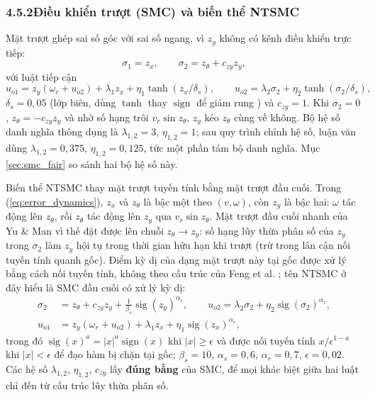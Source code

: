 \documentclass[12pt,a4paper]{article}
\makeatletter
\newcommand{\seclabel}[2]{\phantomsection\protected@edef\@currentlabel{#2}\label{#1}}
\DeclareMathOperator{\sign}{sign}
\makeatother
\begin{document}
\subsubsection*{4.5.2\quad Điều khiển trượt (SMC) và biến thể NTSMC}
\seclabel{sec:smc}{4.5.2}

Mặt trượt ghép sai số góc với sai số ngang, vì $z_y$ không có kênh điều khiển trực tiếp:
\begin{equation}\label{eq:smc_s2}
    \sigma_1 = z_x, \qquad \sigma_2 = z_\theta + c_{zy} z_y ,
\end{equation}
với luật tiếp cận
\begin{equation}\label{eq:smc_u}
    u_{o1} = z_y(\omega_r + u_{o2}) + \lambda_1 z_x + \eta_1 \tanh(z_x/\delta_s), \qquad
    u_{o2} = \lambda_2 \sigma_2 + \eta_2 \tanh(\sigma_2/\delta_s),
\end{equation}
$\delta_s = 0{,}05$ (lớp biên, dùng $\tanh$ thay $\sign$ để giảm rung \cite{Slotine1991}) và $c_{zy} = 1$. Khi $\sigma_2 = 0$, $z_\theta = -c_{zy}z_y$ và nhờ số hạng trôi $v_r\sin z_\theta$, $z_y$ kéo $z_\theta$ cùng về không. Bộ hệ số danh nghĩa thông dụng là $\lambda_{1,2} = 3$, $\eta_{1,2} = 1$; sau quy trình chỉnh hệ số, luận văn dùng $\lambda_{1,2} = 0{,}375$, $\eta_{1,2} = 0{,}125$, tức một phần tám bộ danh nghĩa. Mục \ref{sec:smc_fair} so sánh hai bộ hệ số này.

Biến thể NTSMC thay mặt trượt tuyến tính bằng mặt trượt đầu cuối. Trong (\ref{eq:error_dynamics}), $z_x$ và $z_\theta$ là bậc một theo $(v, \omega)$, còn $z_y$ là bậc hai: $\omega$ tác động lên $z_\theta$, rồi $z_\theta$ tác động lên $z_y$ qua $v_r \sin z_\theta$. Mặt trượt đầu cuối nhanh của Yu \& Man \cite{YuMan2002} vì thế đặt được lên chuỗi $z_\theta \to z_y$: số hạng lũy thừa phân số của $z_y$ trong $\sigma_2$ làm $z_y$ hội tụ trong thời gian hữu hạn khi trượt (trừ trong lân cận nối tuyến tính quanh gốc). Điểm kỳ dị của dạng mặt trượt này tại gốc được xử lý bằng cách nối tuyến tính, không theo cấu trúc của Feng et al. \cite{Feng2002}; tên NTSMC ở đây hiểu là SMC đầu cuối có xử lý kỳ dị:
\begin{equation}\label{eq:ntsmc}
\begin{aligned}
    \sigma_2 &= z_\theta + c_{zy} z_y + \tfrac{1}{\beta_s}\operatorname{sig}(z_y)^{\alpha_s}, \qquad
    u_{o2} = \lambda_2 \sigma_2 + \eta_2 \operatorname{sig}(\sigma_2)^{\alpha_r}, \\
    u_{o1} &= z_y(\omega_r + u_{o2}) + \lambda_1 z_x + \eta_1 \operatorname{sig}(z_x)^{\alpha_r},
\end{aligned}
\end{equation}
trong đó $\operatorname{sig}(x)^a = |x|^a\sign(x)$ khi $|x| \geq \epsilon$ và được nối tuyến tính $x/\epsilon^{1-a}$ khi $|x| < \epsilon$ để đạo hàm bị chặn tại gốc; $\beta_s = 10$, $\alpha_s = 0{,}6$, $\alpha_r = 0{,}7$, $\epsilon = 0{,}02$. Các hệ số $\lambda_{1,2}$, $\eta_{1,2}$, $c_{zy}$ lấy \textbf{đúng bằng} của SMC, để mọi khác biệt giữa hai luật chỉ đến từ cấu trúc lũy thừa phân số.
\end{document}
